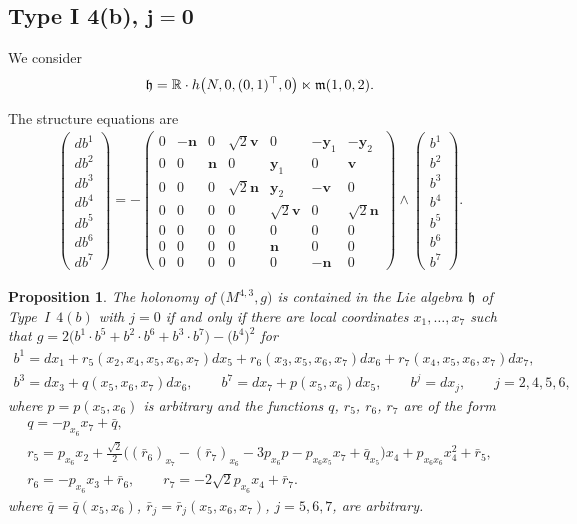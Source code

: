 \documentclass[pdftex]{sigma}
\numberwithin{equation}{section}
\newtheorem{Proposition}[Theorem]{Proposition}
 { \theoremstyle{definition}
\newtheorem{Definition}[Theorem]{Definition}
\newtheorem{Example}[Theorem]{Example}
\newtheorem{Remark}[Theorem]{Remark} }
\newcommand\fh{{\frak h}}
\newcommand\fm{{\frak m}}
\newcommand\by{{\mathbf y}}
\newcommand\bn{{\mathbf n}}
\newcommand\bv{{\mathbf v}}
\newcommand\RR{{\mathbb R}}
\begin{document}
\subsection[Type I 4(b), $j=0$]{Type I 4(b), $\boldsymbol{j=0}$}
We consider
\begin{gather*}\fh=\RR\cdot h\big(N,0,(0,1)^\top,0\big) \ltimes\fm(1,0,2).\end{gather*}

The structure equations are
\begin{gather}\label{EI4(b)}\left(\begin{matrix} db^1\\db^2\\db^3\\db^4\\db^5\\db^6\\db^7\end{matrix}\right) = -\left(
\begin{matrix}
0 &-\bn&0&\sqrt 2 \bv&0&-\by_1&-\by_2\\
0&0&\bn&0&\by_1&0&\bv\\
0&0&0&\sqrt 2 \bn&\by_2&-\bv&0\\
0&0&0&0&\sqrt 2 \bv&0&\sqrt 2 \bn\\
0&0&0&0&0&0&0\\
0&0&0&0&\bn&0&0\\
0&0&0&0&0&-\bn&0
\end{matrix}\right) \wedge \left(\begin{matrix} b^1\\b^2\\b^3\\b^4\\b^5\\b^6\\b^7\end{matrix}\right).
\end{gather}

\begin{Proposition} The holonomy of $\big(M^{4,3},g\big)$ is contained in the Lie algebra $\fh$ of Type~I~$4(b)$ with $j=0$ if and only if there are local coordinates $x_1,\dots,x_7$ such that $g=2\big(b^1\cdot b^5+b^2\cdot b^6+b^3\cdot b^7\big)- \big(b^4\big)^2$ for
\begin{gather*}
b^1=dx_1 + r_5(x_2,x_4,x_5,x_6, x_7)dx_5+r_6(x_3,x_5,x_6,x_7)dx_6+r_7(x_4,x_5,x_6,x_7)dx_7, \\
b^3= dx_3+q(x_5,x_6,x_7) dx_6, \qquad
b^7= dx_7 +p(x_5,x_6)dx_5,\qquad
b^j= dx_j, \qquad j=2,4,5,6,
\end{gather*}
where
$p=p(x_5,x_6)$ is arbitrary and the functions $q$, $r_5$, $r_6$, $r_7$ are of the form
\begin{gather*}
q=-p_{x_6}x_7+\bar q, \\
r_5=p_{x_6}x_2+ \tfrac{\sqrt2}2 \big( (\bar r_6)_{x_7}-(\bar r_7)_{x_6}-3p_{x_6}p-p_{x_6x_5}x_7+\bar q_{x_5}\big)x_4+p_{x_6 x_6}x_4^2+\bar r_5,\\
r_6=-p_{x_6}x_3+\bar r_6, \qquad
r_7=-2\sqrt2 p_{x_6}x_4+\bar r_7.
\end{gather*}
where
$\bar q=\bar q(x_5,x_6)$, $\bar r_j =\bar r_j (x_5,x_6,x_7)$, $j=5,6,7$, are arbitrary.
\end{Proposition}
\end{document}
